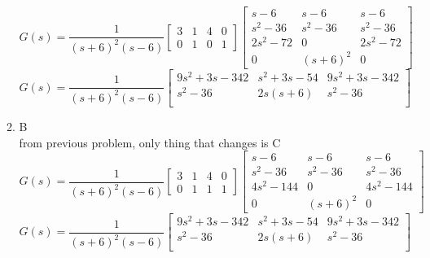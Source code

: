 \begin{enumerate}
\begin{enumerate}
      \begin{equation}
        G(s) =
        \frac 1 {(s+6)^2(s-6)}
        \begin{bmatrix}
          3 & 1 & 4 & 0 \\
          0 & 1 & 0 & 1 
        \end{bmatrix}
        \begin{bmatrix}
          s - 6 & s - 6 & s - 6\\
          s^2 - 36  & s^2 - 36 & s^2 - 36 \\
          2s^2 - 72  & 0 & 2s^2 - 72 \\
          0 & (s + 6)^2 & 0
        \end{bmatrix}
      \end{equation}
      \begin{equation}
        G(s) =
        \frac 1 {(s+6)^2(s-6)}
        \begin{bmatrix}
          9s^2 + 3s - 342 & s^2 + 3s - 54 & 9s^2 + 3s - 342 \\
          s^2 - 36 & 2s(s+6) & s^2 - 36 \\
        \end{bmatrix}
      \end{equation}
    \item B\\
      from previous problem, only thing that changes is C
      \begin{equation}
        G(s) =
        \frac 1 {(s+6)^2(s-6)}
        \begin{bmatrix}
          3 & 1 & 4 & 0 \\
          0 & 1 & 1 & 1 
        \end{bmatrix}
        \begin{bmatrix}
          s - 6 & s - 6 & s - 6\\
          s^2 - 36  & s^2 - 36 & s^2 - 36 \\
          4s^2 - 144  & 0 & 4s^2 - 144 \\
          0 & (s + 6)^2 & 0
        \end{bmatrix}
      \end{equation}
      \begin{equation}
        G(s) =
        \frac 1 {(s+6)^2(s-6)}
        \begin{bmatrix}
          9s^2 + 3s - 342 & s^2 + 3s - 54 & 9s^2 + 3s - 342 \\
          s^2 - 36 & 2s(s+6) & s^2 - 36 \\
        \end{bmatrix}

\end{equation}
\end{enumerate}
\end{enumerate}
